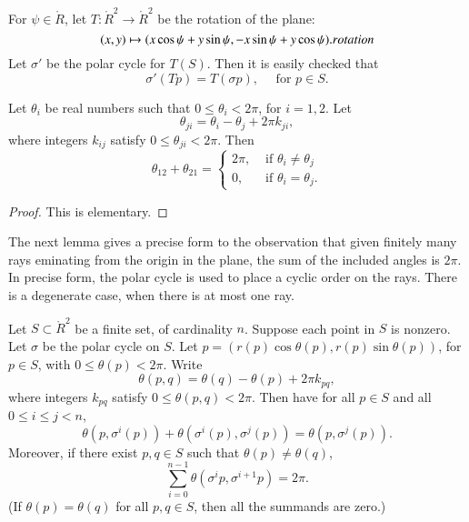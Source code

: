 For $\psi\in\ring{R}$, let $T:\ring{R}^2\to\ring{R}^2$ be the
rotation of the plane:
   \begin{equation}
   \label{eqn:rotate}
   (x,y) \mapsto  (x\cos\psi + y\sin\psi,-x\sin\psi+y\cos\psi).
   \indy{Index}{rotation}
   \end{equation}
Let $\sigma'$ be the polar cycle for $T(S)$.  Then it is easily
checked that
$$
   \sigma'(T p) = T (\sigma p),\quad \text{ for } p\in S. 
$$

\begin{lemma}\label{lemma:polar2}
Let $\theta_i$ be real numbers such that $0\le \theta_i < 2\pi$, for $i=1,2$.
Let $$\theta_{ji} = \theta_i - \theta_j + 2\pi k_{ji},$$
where integers $k_{ij}$ satisfy $0\le \theta_{ji}< 2\pi$.
Then 
$$
  \theta_{12} + \theta_{21} = \begin{cases}
    2\pi, & \text{ if }\theta_i\ne\theta_j\\
    0,    & \text{ if }\theta_i=\theta_j.
    \end{cases}
$$
\end{lemma}

\begin{proof} This is elementary.
\end{proof}

The next lemma gives a precise form to the observation
that given finitely many rays eminating from the origin
in the plane, the sum of the included angles is $2\pi$.
In precise form, the polar cycle is used to place
a cyclic order on the rays.  There is a degenerate case,
when there is at most one ray.


\begin{lemma}\label{lemma:polar-sum}
Let $S\subset\ring{R}^2$ be a finite set,
of cardinality $n$. Suppose each point in $S$ is nonzero.
Let $\sigma$ be the polar cycle on $S$.  
Let $p=(r(p)\cos\theta(p),r(p)\sin\theta(p))$, for $p\in S$, with
$0\le\theta(p)<2\pi$.
Write
   $$
   \theta(p,q) = \theta(q) - \theta(p) + 2\pi k_{pq},
   $$
where  integers $k_{pq}$ satisfy $0\le \theta(p,q) < 2\pi$.
Then have for all $p\in S$
and all $0\le i \le j < n$,
   $$
   \theta(p,\sigma^i(p)) +\theta(\sigma^i(p),\sigma^j(p)) =
   \theta(p,\sigma^j(p)).
   $$
Moreover, if there exist $p,q\in S$ such that $\theta(p)\ne\theta(q)$,
  $$
  \sum_{i=0}^{n-1} \theta(\sigma^{i}p,\sigma^{i+1} p) = 2\pi.
  $$
(If $\theta(p)=\theta(q)$ for all $p,q\in S$, then all the
summands are zero.)
\end{lemma}

